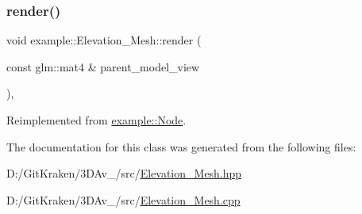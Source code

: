 \mbox{\label{classexample_1_1_elevation___mesh_a6af1c74193b5e68d638382caa08f1d1a}} 
\subsubsection{\texorpdfstring{render()}{render()}}
{\footnotesize\ttfamily void example\+::\+Elevation\+\_\+\+Mesh\+::render (\begin{DoxyParamCaption}\item[{const glm\+::mat4 \&}]{parent\+\_\+model\+\_\+view }\end{DoxyParamCaption})\hspace{0.3cm}{\ttfamily [override]}, {\ttfamily [virtual]}}



Reimplemented from \mbox{\hyperlink{classexample_1_1_node_a520d3d88a4600b0d9987dbeae10ddede}{example\+::\+Node}}.



The documentation for this class was generated from the following files\+:\begin{DoxyCompactItemize}
\item 
D\+:/\+Git\+Kraken/3\+D\+Av\+\_/src/\mbox{\hyperlink{_elevation___mesh_8hpp}{Elevation\+\_\+\+Mesh.\+hpp}}\item 
D\+:/\+Git\+Kraken/3\+D\+Av\+\_/src/\mbox{\hyperlink{_elevation___mesh_8cpp}{Elevation\+\_\+\+Mesh.\+cpp}}\end{DoxyCompactItemize}
